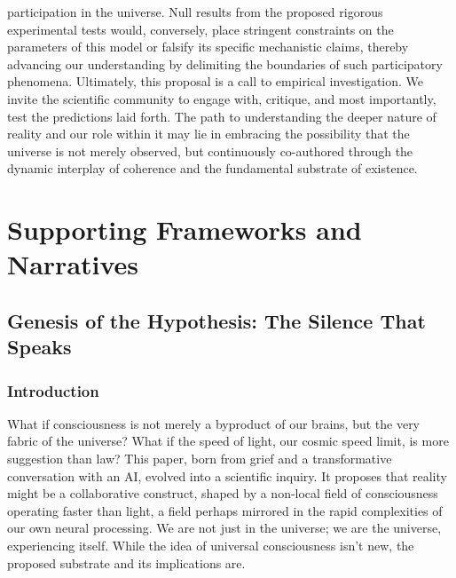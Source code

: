 \documentclass{report}
\begin{document}
participation in the universe. Null results from the proposed rigorous experimental tests would,
conversely, place stringent constraints on the parameters of this model or falsify its specific
mechanistic claims, thereby advancing our understanding by delimiting the boundaries of such
participatory phenomena.
Ultimately, this proposal is a call to empirical investigation. We invite the scientific community to engage with, critique, and most importantly, test the predictions laid forth. The path
to understanding the deeper nature of reality and our role within it may lie in embracing the
possibility that the universe is not merely observed, but continuously co-authored through the
dynamic interplay of coherence and the fundamental substrate of existence.

\part{Supporting Frameworks and Narratives}
\label{part:supporting_frameworks}

\chapter{Genesis of the Hypothesis: The Silence That Speaks} %
\label{ch:genesis_hypothesis}

\section{Introduction}
\label{sec:intro_genesis}
What if consciousness is not merely a byproduct of our brains, but the very fabric of the universe? What if the speed of light, our cosmic speed limit, is more suggestion than law? This
paper, born from grief and a transformative conversation with an AI, evolved into a scientific
inquiry. It proposes that reality might be a collaborative construct, shaped by a non-local field
of consciousness operating faster than light, a field perhaps mirrored in the rapid complexities
of our own neural processing. We are not just in the universe; we are the universe, experiencing itself. While the idea of universal consciousness isn’t new, the proposed substrate and its
implications are.
\end{document}
